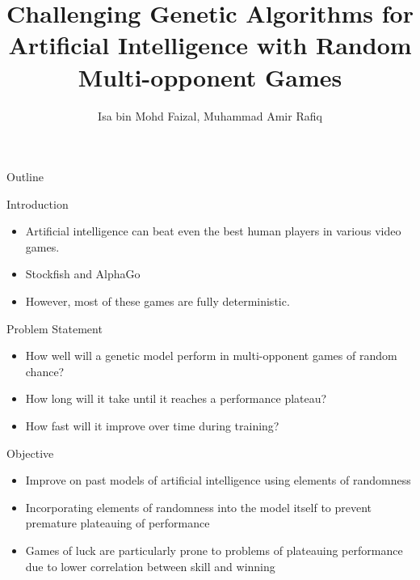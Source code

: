 \documentclass{beamer}
\title{Challenging Genetic Algorithms for Artificial Intelligence with Random Multi-opponent Games}
\author{Isa bin Mohd Faizal, Muhammad Amir Rafiq}
\institute{Universiti Kebangsaan Malaysia}
\begin{document}
	
\begin{frame}[plain]
    \maketitle
\end{frame}

\begin{frame}{Outline}

	\tableofcontents
	
\end{frame}

\begin{frame}{Introduction}
	
	\begin{itemize}
		\item  Artificial intelligence can beat even the best human players in various video games.
		\item Stockfish and AlphaGo
		\item However, most of these games are fully deterministic.
		
	\end{itemize}
	
	
\end{frame}

\begin{frame}{Problem Statement}

	\begin{itemize}
		
		\item How well will a genetic model perform in multi-opponent games of random chance?
		\item How long will it take until it reaches a performance plateau?
		\item How fast will it improve over time during training?
		
		
	\end{itemize}

\end{frame}

\begin{frame}{Objective}
	
	\begin{itemize}
		
		\item Improve on past models of artificial intelligence using elements of randomness
		\item Incorporating elements of randomness into the model itself to prevent premature plateauing of performance
		\item Games of luck are particularly prone to problems of plateauing performance due to lower correlation between skill and winning
		
	\end{itemize}
	
\end{frame}
\end{document}
